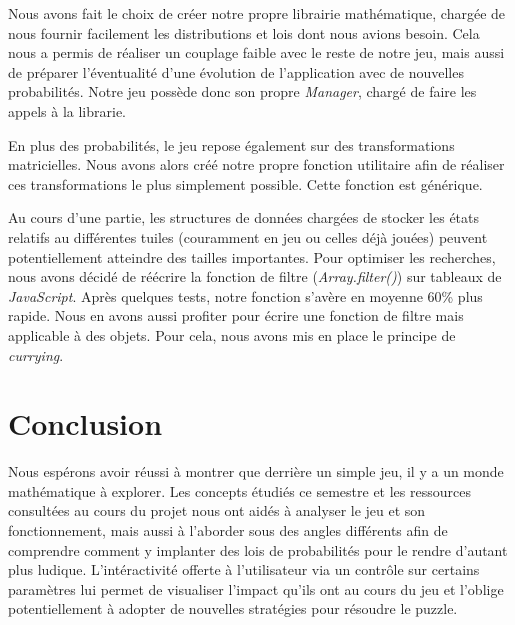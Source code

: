 \documentclass[a4paper, 12pt]{report}
\begin{document}
\tabto{1cm} Nous avons fait le choix de créer notre propre librairie mathématique, chargée de nous fournir facilement les distributions et lois
dont nous avions besoin. Cela nous a permis de réaliser un couplage faible avec le reste de notre jeu, mais aussi de préparer
l'éventualité d'une évolution de l'application avec de nouvelles probabilités. Notre jeu possède donc son propre \textit{Manager}, chargé 
de faire les appels à la librarie.

\vspace{0.5cm}

\tabto{1cm} En plus des probabilités, le jeu repose également sur des transformations
matricielles. Nous avons alors créé notre propre fonction utilitaire afin de réaliser ces transformations le plus
simplement possible. Cette fonction est générique.

\vspace{0.5cm}

\tabto{1cm} Au cours d'une partie, les structures de données chargées de stocker les états relatifs au différentes tuiles
(couramment en jeu ou celles déjà jouées) peuvent potentiellement atteindre des tailles importantes. Pour optimiser les recherches, 
nous avons décidé de réécrire la fonction de filtre (\textit{Array.filter()}) sur tableaux de \textit{JavaScript}.
Après quelques tests, notre fonction s'avère en moyenne 60\% plus rapide. Nous en avons aussi profiter pour écrire une fonction
de filtre mais applicable à des objets. Pour cela, nous avons mis en place le principe de \textit{currying}.

\chapter{Conclusion}

\tabto{1cm}Nous espérons avoir réussi à montrer que derrière un simple jeu, il y a un monde
mathématique à explorer. Les concepts étudiés ce semestre et les ressources consultées au
cours du projet nous ont aidés à analyser le jeu et son fonctionnement, mais aussi à l'aborder
sous des angles différents afin de comprendre comment y implanter des lois de probabilités
pour le rendre d'autant plus ludique. L'intéractivité offerte à l'utilisateur via un contrôle
sur certains paramètres lui permet de visualiser l'impact qu'ils ont au cours du jeu et l'oblige 
potentiellement à adopter de nouvelles stratégies pour résoudre le puzzle.
\end{document}
